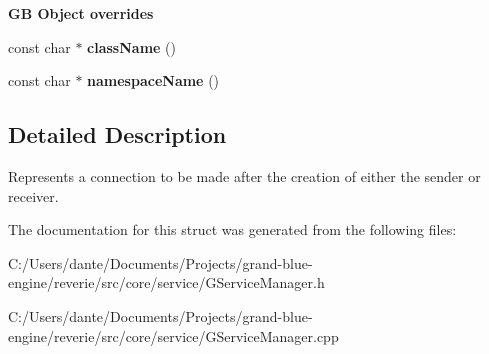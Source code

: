 \begin{Indent}\textbf{ GB Object overrides}\par
\begin{DoxyCompactItemize}
\item 
\mbox{\label{classrev_1_1_deferred_connection_a23657b59dcc41f7d05f1ea02ec8db680}} 
const char $\ast$ {\bfseries class\+Name} ()
\item 
\mbox{\label{classrev_1_1_deferred_connection_abb77662f1ef3c3c69afe20be689a34fb}} 
const char $\ast$ {\bfseries namespace\+Name} ()
\end{DoxyCompactItemize}
\end{Indent}


\subsection{Detailed Description}
Represents a connection to be made after the creation of either the sender or receiver. 

The documentation for this struct was generated from the following files\+:\begin{DoxyCompactItemize}
\item 
C\+:/\+Users/dante/\+Documents/\+Projects/grand-\/blue-\/engine/reverie/src/core/service/G\+Service\+Manager.\+h\item 
C\+:/\+Users/dante/\+Documents/\+Projects/grand-\/blue-\/engine/reverie/src/core/service/G\+Service\+Manager.\+cpp\end{DoxyCompactItemize}
